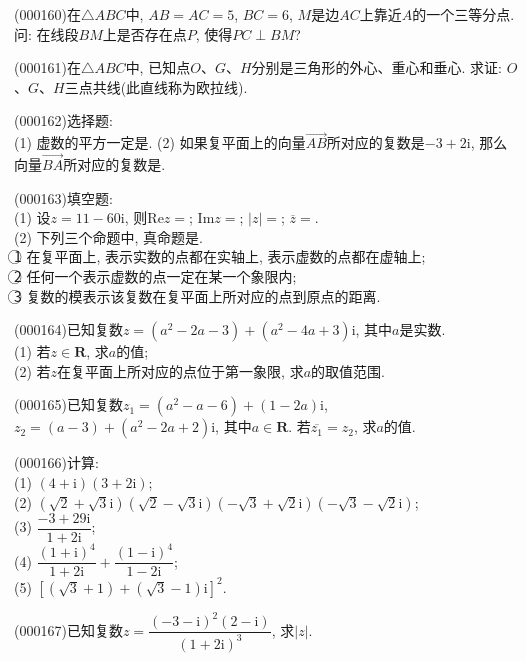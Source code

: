 \item (000160)在$\triangle ABC$中, $AB=AC=5$, $BC=6$, $M$是边$AC$上靠近$A$的一个三等分点. 问: 在线段$BM$上是否存在点$P$, 使得$PC\perp BM$?
\item (000161)在$\triangle ABC$中, 已知点$O$、$G$、$H$分别是三角形的外心、重心和垂心. 求证: $O$、$G$、$H$三点共线(此直线称为欧拉线).
\item (000162)选择题:\\
(1) 虚数的平方一定是.
(2) 如果复平面上的向量$\overrightarrow{AB}$所对应的复数是$-3+2\mathrm{i}$, 那么向量$\overrightarrow{BA}$所对应的复数是.
\item (000163)填空题:\\
(1) 设$z=11-60\mathrm{i}$, 则$\mathrm{Re}z=$; $\mathrm{Im}z=$; $|z|=$; $\overline{z}=$.\\
(2) 下列三个命题中, 真命题是.\\
\textcircled{1} 在复平面上, 表示实数的点都在实轴上, 表示虚数的点都在虚轴上;\\
\textcircled{2} 任何一个表示虚数的点一定在某一个象限内;\\
\textcircled{3} 复数的模表示该复数在复平面上所对应的点到原点的距离.
\item (000164)已知复数$z=(a^2-2a-3)+(a^2-4a+3)\mathrm{i}$, 其中$a$是实数.\\
(1) 若$z\in \mathbf{R}$, 求$a$的值;\\
(2) 若$z$在复平面上所对应的点位于第一象限, 求$a$的取值范围.
\item (000165)已知复数$z_1=(a^2-a-6)+(1-2a)\mathrm{i}$, $z_2=(a-3)+(a^2-2a+2)\mathrm{i}$, 其中$a\in \mathbf{R}$.
若$\overline{z_1}=z_2$, 求$a$的值.
\item (000166)计算:\\
(1) $(4+\mathrm{i})(3+2\mathrm{i})$;\\
(2) $(\sqrt 2+\sqrt 3\mathrm{i})(\sqrt 2-\sqrt 3\mathrm{i})(-\sqrt 3+\sqrt 2\mathrm{i})(-\sqrt 3-\sqrt 2\mathrm{i})$;\\
(3) $\dfrac{-3+29\mathrm{i}}{1+2\mathrm{i}}$;\\
(4) $\dfrac{(1+\mathrm{i})^4}{1+2\mathrm{i}}+\dfrac{(1-\mathrm{i})^4}{1-2\mathrm{i}}$;\\
(5) $[(\sqrt 3+1)+(\sqrt 3-1)\mathrm{i}]^2$.
\item (000167)已知复数$z=\dfrac{(-3-\mathrm{\mathrm{i}})^2(2-\mathrm{\mathrm{i}})}{(1+2\mathrm{i})^3}$, 求$|z|$.

